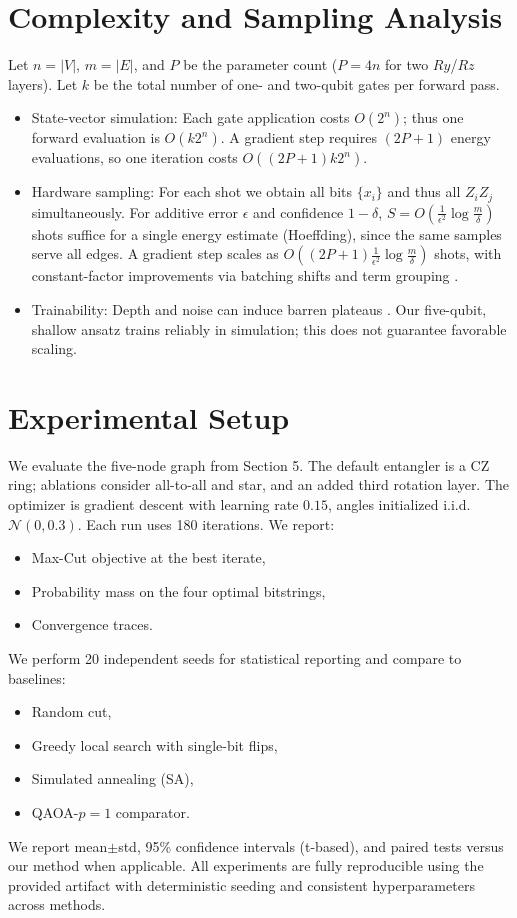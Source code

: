 \section{Complexity and Sampling Analysis}
Let $n=|V|$, $m=|E|$, and $P$ be the parameter count ($P=4n$ for two $Ry$/$Rz$ layers). Let $k$ be the total number of one- and two-qubit gates per forward pass.

\begin{itemize}
    \item State-vector simulation: Each gate application costs $O(2^n)$; thus one forward evaluation is $O(k2^n)$. A gradient step requires $(2P{+}1)$ energy evaluations, so one iteration costs $O((2P{+}1)k2^n)$.
    \item Hardware sampling: For each shot we obtain all bits $\{x_i\}$ and thus all $Z_iZ_j$ simultaneously. For additive error $\epsilon$ and confidence $1{-}\delta$, $S=O\!\left(\tfrac{1}{\epsilon^2}\log\tfrac{m}{\delta}\right)$ shots suffice for a single energy estimate (Hoeffding), since the same samples serve all edges. A gradient step scales as $O\!\left((2P{+}1)\tfrac{1}{\epsilon^2}\log\tfrac{m}{\delta}\right)$ shots, with constant-factor improvements via batching shifts and term grouping \cite{huggins2021efficient,verteletskyi2020measurement}.
    \item Trainability: Depth and noise can induce barren plateaus \cite{mcclean2018barren,arrasmith2021trainability,wang2021noiseplateaus}. Our five-qubit, shallow ansatz trains reliably in simulation; this does not guarantee favorable scaling.
\end{itemize}

\section{Experimental Setup}
We evaluate the five-node graph from Section 5. The default entangler is a CZ ring; ablations consider all-to-all and star, and an added third rotation layer. The optimizer is gradient descent with learning rate $0.15$, angles initialized i.i.d. $\mathcal{N}(0,0.3)$. Each run uses 180 iterations. We report:
\begin{itemize}
    \item Max-Cut objective at the best iterate,
    \item Probability mass on the four optimal bitstrings,
    \item Convergence traces.
\end{itemize}
We perform 20 independent seeds for statistical reporting and compare to baselines:
\begin{itemize}
    \item Random cut,
    \item Greedy local search with single-bit flips,
    \item Simulated annealing (SA),
    \item QAOA-$p{=}1$ comparator.
\end{itemize}
We report mean$\pm$std, 95\% confidence intervals (t-based), and paired tests versus our method when applicable. All experiments are fully reproducible using the provided artifact with deterministic seeding and consistent hyperparameters across methods.

